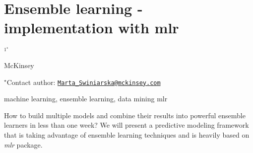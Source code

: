 \documentclass[\main/boa.tex]{subfiles}
\begin{document}
\section{Ensemble learning - implementation with mlr}

\begin{center}
  {\bf {}$^{1^\star}$}
\end{center}

\vskip 0.3cm

\begin{affiliations}
\begin{enumerate}
\begin{minipage}{0.915\textwidth}
\centering
\item McKinsey \\[-2pt]
\end{minipage}
\end{enumerate}
$^\star$Contact author: \href{mailto:Marta_Swiniarska@mckinsey.com}{\nolinkurl{Marta\_Swiniarska@mckinsey.com}}\\
\end{affiliations}

\vskip 0.5cm

\begin{minipage}{0.915\textwidth}
\keywords machine learning, ensemble learning, data mining
\packages mlr
\end{minipage}

\vskip 0.8cm

How to build multiple models and combine their results into powerful
ensemble learners in less than one week? We will present a predictive
modeling framework that is taking advantage of ensemble learning
techniques and is heavily based on \emph{mlr} package.
\end{document}
